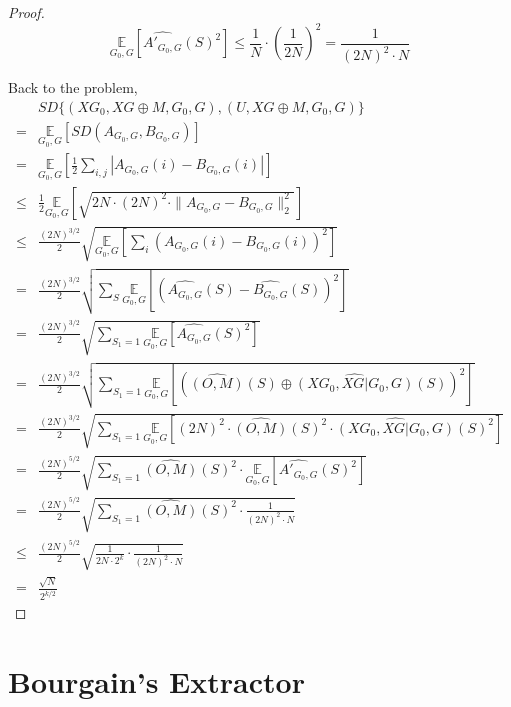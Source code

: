 \begin{proof}
$$\underset{G_0, G} {\mathbb{E}} 
	[\widehat{A'_{G_0,G}}(S)^2] \leq \frac{1}{N} \cdot (\frac{1}{2N})^2 
	= \frac{1}{(2N)^2 \cdot N}$$

Back to the problem,
\begin{align*}
& SD \{ (XG_0, XG \oplus M, G_0, G), (U, XG \oplus M, G_0, G) \} \\
= & \underset{G_0, G} {\mathbb{E}} \left[
	SD (A_{G_0,G},B_{G_0,G}) \right] \\
= & \underset{G_0, G} {\mathbb{E}} \left[
	\frac{1}{2} \sum\limits_{i,j} | A_{G_0,G}(i)- B_{G_0,G} (i)| \right] \\
\leq & \frac{1}{2} \underset{G_0, G} {\mathbb{E}} \left[ \sqrt{
	2N \cdot (2N)^2 \cdot \| A_{G_0,G} - B_{G_0,G} \|_2^2 }  \right] \\	
\leq & \frac{(2N)^{3/2}}{2} \sqrt{ \underset{G_0, G} {\mathbb{E}} \left[ 
	\sum\limits_{i} (A_{G_0,G}(i) - B_{G_0,G}(i) )^2 \right] } \\
= & \frac{(2N)^{3/2}}{2} \sqrt{
	\sum\limits_{S} \underset{G_0, G} {\mathbb{E}} \left[  
		(\widehat{A_{G_0,G}}(S) -
	     \widehat{B_{G_0,G}} (S) )^2 \right] }\\	
= & \frac{(2N)^{3/2}}{2} \sqrt{
	\sum\limits_{S_1 = 1} \underset{G_0, G} {\mathbb{E}} \left[  
		\widehat{A_{G_0,G}}(S)^2 \right] } \\
= & \frac{(2N)^{3/2}}{2} \sqrt{
	\sum\limits_{S_1 = 1} \underset{G_0, G} {\mathbb{E}} \left[  
		(\widehat{(O, M)}(S) \oplus
		\widehat{(XG_0, XG |G_0, G)}(S))^2 \right] } \\		
= & \frac{(2N)^{3/2}}{2} \sqrt{
	\sum\limits_{S_1 = 1} \underset{G_0, G} {\mathbb{E}} \left[  
		(2N)^2 \cdot \widehat{(O, M)}(S)^2 \cdot 
		\widehat{(XG_0, XG |G_0, G)}(S)^2 \right] } \\
=& \frac{(2N)^{5/2}}{2} \sqrt{
	\sum\limits_{S_1 = 1} \widehat{(O, M)}(S)^2 \cdot 
		\underset{G_0, G} {\mathbb{E}} \left[  
		\widehat{A'_{G_0,G}}(S)^2 \right] } \\	
=& \frac{(2N)^{5/2}}{2} \sqrt{
	\sum\limits_{S_1 = 1} \widehat{(O, M)}(S)^2 \cdot 
		\frac{1} {(2N)^2 \cdot N} }	\\
\leq &	\frac{(2N)^{5/2}}{2} \sqrt{
	\frac{1}{2N \cdot 2^k} \cdot 
		\frac{1} {(2N)^2 \cdot N} }\\
= & \frac{\sqrt{N}}{2^{k/2}}						     		                                 
\end{align*}
\end{proof}

\chapter{Bourgain's Extractor}

